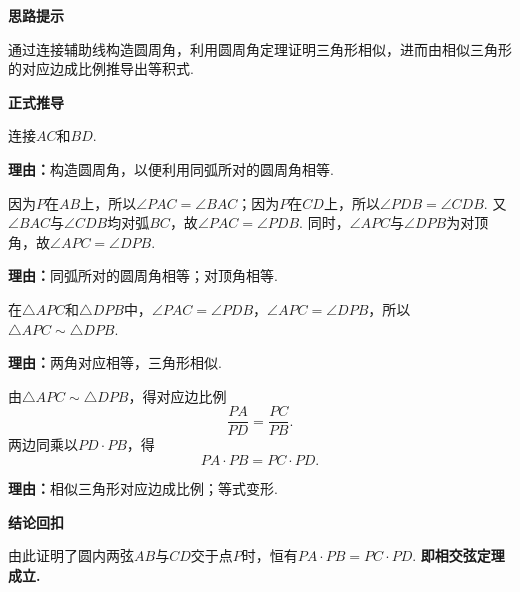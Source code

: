 \begin{proofbox}
	\textbf{\textcolor{CProof}{思路提示}}

	通过连接辅助线构造圆周角，利用圆周角定理证明三角形相似，进而由相似三角形的对应边成比例推导出等积式.

	\medskip
	\textbf{\textcolor{CProof}{正式推导}}

	\begin{description}[style=nextline, leftmargin=2.8em, labelsep=0.5em, itemsep=0.55em]
		\item[\textbf{步骤一（连接辅助线）：}]
		      连接$AC$和$BD$.
		      \par\textbf{理由：}构造圆周角，以便利用同弧所对的圆周角相等.

		\item[\textbf{步骤二（角相等）：}]
		      因为$P$在$AB$上，所以$\angle PAC=\angle BAC$；因为$P$在$CD$上，所以$\angle PDB=\angle CDB$. 又$\angle BAC$与$\angle CDB$均对弧$BC$，故$\angle PAC=\angle PDB$. 同时，$\angle APC$与$\angle DPB$为对顶角，故$\angle APC=\angle DPB$.
		      \par\textbf{理由：}同弧所对的圆周角相等；对顶角相等.

		\item[\textbf{步骤三（三角形相似）：}]
		      在$\triangle APC$和$\triangle DPB$中，$\angle PAC=\angle PDB$，$\angle APC=\angle DPB$，所以$\triangle APC\sim\triangle DPB$.
		      \par\textbf{理由：}两角对应相等，三角形相似.

		\item[\textbf{步骤四（比例乘积）：}]
		      由$\triangle APC\sim\triangle DPB$，得对应边比例
		      \[
			      \frac{PA}{PD}=\frac{PC}{PB}.
		      \]
		      两边同乘以$PD\cdot PB$，得
		      \[
			      PA\cdot PB=PC\cdot PD.
		      \]
		      \par\textbf{理由：}相似三角形对应边成比例；等式变形.
	\end{description}

	\medskip
	\textbf{\textcolor{CProof}{结论回扣}}

	由此证明了圆内两弦$AB$与$CD$交于点$P$时，恒有$PA\cdot PB=PC\cdot PD$. \textbf{即相交弦定理成立.}
\end{proofbox}